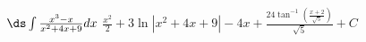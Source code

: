 {$\ds \int \frac{x^3-x}{x^2+4 x+9} dx $}
{$\frac{x^2}{2}+3 \ln \left|x^2+4 x+9\right|-4 x+\frac{24 \tan ^{-1}\left(\frac{x+2}{\sqrt{5}}\right)}{\sqrt{5}}+C$}